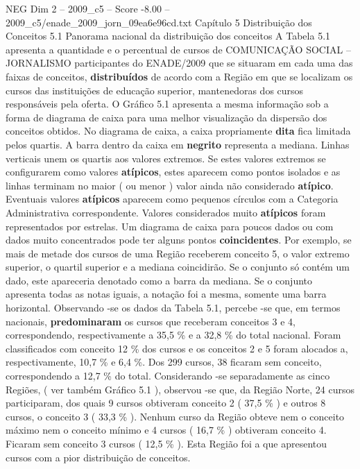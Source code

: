 \begin{textsample}{NEG Dim 2 – 2009\_c5 – Score -8.00 – 2009\_c5/enade\_2009\_jorn\_09ea6e96cd.txt}  \label{ex:f2_neg_015}
Capítulo 5 Distribuição dos Conceitos 5.1 Panorama nacional da distribuição dos conceitos A Tabela 5.1 apresenta a quantidade e o percentual de cursos de COMUNICAÇÃO SOCIAL – JORNALISMO participantes do ENADE/2009 que se situaram em cada uma das faixas de conceitos, \textbf{distribuídos} de acordo com a Região em que se localizam os cursos das instituições de educação superior, mantenedoras dos cursos responsáveis pela oferta.
O Gráfico 5.1 apresenta a mesma informação sob a forma de diagrama de caixa para uma melhor visualização da dispersão dos conceitos obtidos.
No diagrama de caixa, a caixa propriamente \textbf{dita} fica limitada pelos quartis.
A barra dentro da caixa em \textbf{negrito} representa a mediana.
Linhas verticais unem os quartis aos valores extremos.
Se estes valores extremos se configurarem como valores \textbf{atípicos}, estes aparecem como pontos isolados e as linhas terminam no maior ( ou menor ) valor ainda não considerado \textbf{atípico}.
Eventuais valores \textbf{atípicos} aparecem como pequenos círculos com a Categoria Administrativa correspondente.
Valores considerados muito \textbf{atípicos} foram representados por estrelas.
Um diagrama de caixa para poucos dados ou com dados muito concentrados pode ter alguns pontos \textbf{coincidentes}.
Por exemplo, se mais de metade dos cursos de uma Região receberem conceito 5, o valor extremo superior, o quartil superior e a mediana coincidirão.
Se o conjunto só contém um dado, este apareceria denotado como a barra da mediana.
Se o conjunto apresenta todas as notas iguais, a notação foi a mesma, somente uma barra horizontal.
Observando -se os dados da Tabela 5.1, percebe -se que, em termos nacionais, \textbf{predominaram} os cursos que receberam conceitos 3 e 4, correspondendo, respectivamente a 35,5 \% e a 32,8 \% do total nacional.
Foram classificados com conceito 12 \% dos cursos e os conceitos 2 e 5 foram alocados a, respectivamente, 10,7 \% e 6,4 \%.
Dos 299 cursos, 38 ficaram sem conceito, correspondendo a 12,7 \% do total.
Considerando -se separadamente as cinco Regiões, ( ver também Gráfico 5.1 ), observou -se que, da Região Norte, 24 cursos participaram, dos quais 9 cursos obtiveram conceito 2 ( 37,5 \% ) e outros 8 cursos, o conceito 3 ( 33,3 \% ).
Nenhum curso da Região obteve nem o conceito máximo nem o conceito mínimo e 4 cursos ( 16,7 \% ) obtiveram conceito 4.
Ficaram sem conceito 3 cursos ( 12,5 \% ).
Esta Região foi a que apresentou cursos com a pior distribuição de conceitos.

\end{textsample}
